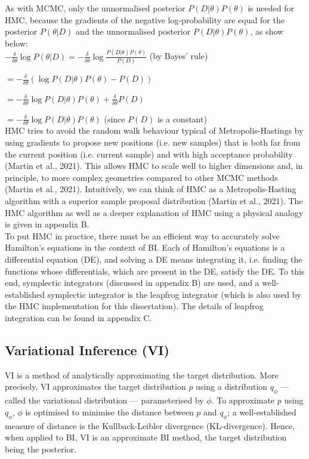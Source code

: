 \documentclass[conference]{IEEEtran}
\begin{document}
As with MCMC, only the unnormalised posterior $P(D|\theta)P(\theta)$ is needed for HMC, because the gradients of the negative log-probability are equal for the posterior $P(\theta|D)$ and the unnormalised posterior $P(D|\theta)P(\theta)$, as show below:\\

$\displaystyle - \frac{\delta}{\delta \theta} \log P(\theta|D) = - \frac{\delta}{\delta \theta} \log \frac{P(D|\theta)P(\theta)}{P(D)}$ (by Bayes' rule)

$\displaystyle = - \frac{\delta}{\delta \theta} (\log P(D|\theta) P(\theta) - P(D))$

$\displaystyle = - \frac{\delta}{\delta \theta} \log P(D|\theta) P(\theta) + \frac{\delta}{\delta \theta} P(D)$

$\displaystyle = - \frac{\delta}{\delta \theta} \log P(D|\theta) P(\theta)$ (since $P(D)$ is a constant)\\

HMC tries to avoid the random walk behaviour typical of Metropolis-Hastings by using gradients to propose new positions (i.e. new samples) that is both far from the current position (i.e. current sample) and with high acceptance probability (Martin et al., 2021). This allows HMC to scale well to higher dimensions and, in principle, to more complex geometries compared to other MCMC methods (Martin et al., 2021). Intuitively, we can think of HMC as a Metropolis-Hasting algorithm with a superior sample proposal distribution (Martin et al., 2021). The HMC algorithm as well as a deeper explanation of HMC using a physical analogy is given in appendix B.\\

To put HMC in practice, there must be an efficient way to accurately solve Hamilton's equations in the context of BI. Each of Hamilton's equations is a differential equation (DE), and solving a DE means integrating it, i.e. finding the functions whose differentials, which are present in the DE, satisfy the DE. To this end, symplectic integrators (discussed in appendix B) are used, and a well-established symplectic integrator is the leapfrog integrator (which is also used by the HMC implementation for this dissertation). The details of leapfrog integration can be found in appendix C.

\subsection{Variational Inference (VI)}
VI is a method of analytically approximating the target distribution. More precisely, VI approximates the target distribution $p$ using a distribution $q_\phi$ — called the variational distribution — parameterised by $\phi$. To approximate $p$ using $q_{\phi}$, $\phi$ is optimised to minimise the distance between $p$ and $q_{\phi}$; a well-established measure of distance is the Kullback-Leibler divergence (KL-divergence). Hence, when applied to BI, VI is an approximate BI method, the target distribution being the posterior.\\
\end{document}
